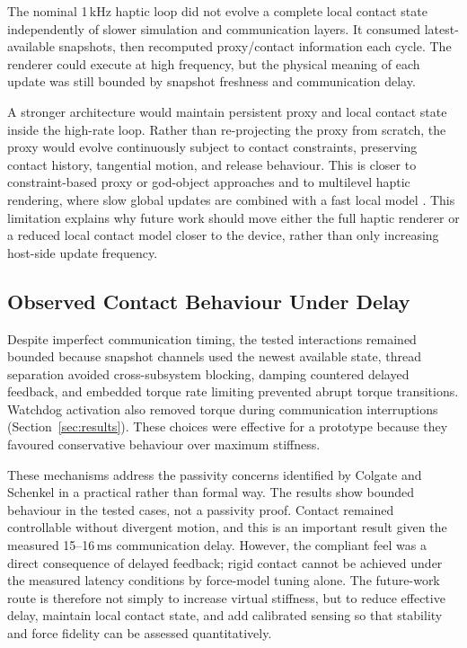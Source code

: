 The nominal 1\,kHz haptic loop did not evolve a complete local contact state independently of slower simulation and communication layers. It consumed latest-available snapshots, then recomputed proxy/contact information each cycle. The renderer could execute at high frequency, but the physical meaning of each update was still bounded by snapshot freshness and communication delay.

A stronger architecture would maintain persistent proxy and local contact state inside the high-rate loop. Rather than re-projecting the proxy from scratch, the proxy would evolve continuously subject to contact constraints, preserving contact history, tangential motion, and release behaviour. This is closer to constraint-based proxy or god-object approaches \cite{zillesConstraintbasedGodobjectMethod1995,ruspiniHapticDisplayComplex1997,salisburyHapticRenderingSurfaces1997} and to multilevel haptic rendering, where slow global updates are combined with a fast local model \cite{ruspiniHapticDisplayComplex1997}. This limitation explains why future work should move either the full haptic renderer or a reduced local contact model closer to the device, rather than only increasing host-side update frequency.

\subsection{Observed Contact Behaviour Under Delay} \label{sec:discussion_stability}

Despite imperfect communication timing, the tested interactions remained bounded because snapshot channels used the newest available state, thread separation avoided cross-subsystem blocking, damping countered delayed feedback, and embedded torque rate limiting prevented abrupt torque transitions. Watchdog activation also removed torque during communication interruptions (Section~\ref{sec:results}). These choices were effective for a prototype because they favoured conservative behaviour over maximum stiffness.

These mechanisms address the passivity concerns identified by Colgate and Schenkel \cite{colgatePassivityClassSampleddata1997} in a practical rather than formal way. The results show bounded behaviour in the tested cases, not a passivity proof. Contact remained controllable without divergent motion, and this is an important result given the measured 15--16\,ms communication delay. However, the compliant feel was a direct consequence of delayed feedback; rigid contact cannot be achieved under the measured latency conditions by force-model tuning alone. The future-work route is therefore not simply to increase virtual stiffness, but to reduce effective delay, maintain local contact state, and add calibrated sensing so that stability and force fidelity can be assessed quantitatively.

